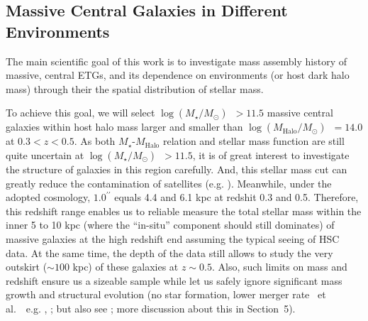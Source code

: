 \documentclass[preprint]{aastex}
\def\arcsec{{\prime\prime}}
\def\etal{{\ et al.~}}
\def\logms{{$\log (M_{\star}/M_{\odot})$}~}
\def\logmh{{$\log (M_{\mathrm{Halo}}/M_{\odot})$}~}
\begin{document}
\begin{CJK*}{UTF8}{gbsn}
\subsection{Massive Central Galaxies in Different Environments}

    The main scientific goal of this work is to investigate mass assembly history of
    massive, central ETGs, and its dependence on environments (or host dark halo mass)
    through their the spatial distribution of stellar mass.  
    
    To achieve this goal, we will select \logms$ > 11.5$ massive central galaxies within
    host halo mass larger and smaller than \logmh$= 14.0$ at $0.3 < z < 0.5$.  
    As both $M_{\star}$-$M_{\mathrm{Halo}}$ relation and stellar mass function are still
    quite uncertain at \logms$ > 11.5$, it is of great interest to investigate the
    structure of galaxies in this region carefully.
    And, this stellar mass cut can greatly reduce the contamination of satellites (e.g.
    \citealt{vanUitert2016}).  
    Meanwhile, under the adopted cosmology, $1.0^{\arcsec}$ equals 4.4 and 6.1 kpc at 
    redshit 0.3 and 0.5.  
    Therefore, this redshift range enables us to reliable measure the total stellar mass 
    within the inner 5 to 10 kpc (where the ``in-situ'' component should still dominates) 
    of massive galaxies at the high redshift end assuming the typical seeing of HSC data. 
    At the same time, the depth of the data still allows to study the very outskirt ($\sim
    100$ kpc) of these galaxies at $z\sim 0.5$.  
    Also, such limits on mass and redshift ensure us a sizeable sample while let us 
    safely ignore significant mass growth and structural evolution 
    (no star formation, lower merger rate \etal~e.g.
    \citealt{Bellstedt2016}, \citealt{Inagaki2015}; but also see \citealt{Bai2014}; 
    more discussion about this in Section~5). 
        

\end{CJK*}
\end{document}
